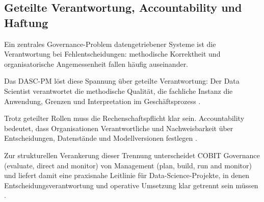 \subsection{Geteilte Verantwortung, Accountability und Haftung}
Ein zentrales Governance-Problem datengetriebener Systeme ist die Verantwortung bei Fehlentscheidungen: methodische Korrektheit und organisatorische Angemessenheit fallen häufig auseinander.

Das DASC-PM löst diese Spannung über geteilte Verantwortung: Der Data Scientist verantwortet die methodische Qualität, die fachliche Instanz die Anwendung, Grenzen und Interpretation im Geschäftsprozess \cite{schulz_dasc-pm_2022}.

Trotz geteilter Rollen muss die Rechenschaftspflicht klar sein. Accountability bedeutet, dass Organisationen Verantwortliche und Nachweisbarkeit über Entscheidungen, Datenstände und Modellversionen festlegen \cite{FloridiCowls2019}.

Zur strukturellen Verankerung dieser Trennung unterscheidet COBIT
Governance (evaluate, direct and monitor) von Management (plan, build, run and monitor)
und liefert damit eine praxisnahe Leitlinie für Data-Science-Projekte,
in denen Entscheidungsverantwortung und operative Umsetzung klar getrennt sein müssen \cite{ISACA2018}.
